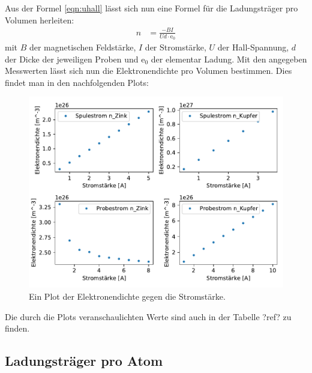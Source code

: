     \noindent
    Aus der Formel \ref{eqn:uhall} lässt sich nun eine Formel für die Ladungsträger pro Volumen herleiten:
    \begin{align}
        n &= \frac{-BI}{Ud\cdot\text{e}_0}
    \end{align}
    mit $B$ der magnetischen Feldstärke, $I$ der Stromstärke, $U$ der Hall-Spannung, $d$ der Dicke der jeweiligen Proben und $\text{e}_0$ der 
    elementar Ladung.
    \noindent
    Mit den angegeben Messwerten lässt sich nun die Elektronendichte pro Volumen bestimmen. Dies findet man in den nachfolgenden Plots:
    \begin{figure}[H]
        \centering
        \includegraphics[width=1.1\textwidth]{build/N.pdf}
        \caption{Ein Plot der Elektronendichte gegen die Stromstärke.}
        \label{img:elekdichte}
    \end{figure}
    \noindent
    Die durch die Plots veranschaulichten Werte sind auch in der Tabelle ?ref? zu finden.


    \subsection{Ladungsträger pro Atom}


